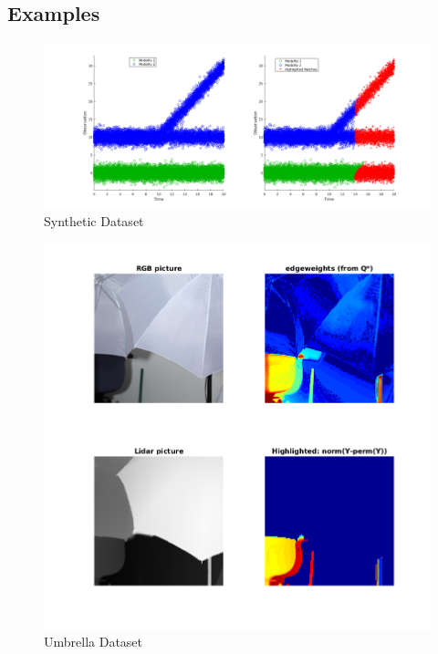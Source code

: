 \documentclass[12pt]{article}
\begin{document}
\subsection*{Examples}

\begin{figure}
  \centering
  \includegraphics[width=\textwidth]{./FeatureComparison.png}
  \caption{Synthetic Dataset}
\end{figure}

\begin{figure}
  \centering
  \includegraphics[width=\textwidth]{./UmbrellaFeatureComparison.png}
  \caption{Umbrella Dataset}
\end{figure}
\end{document}
